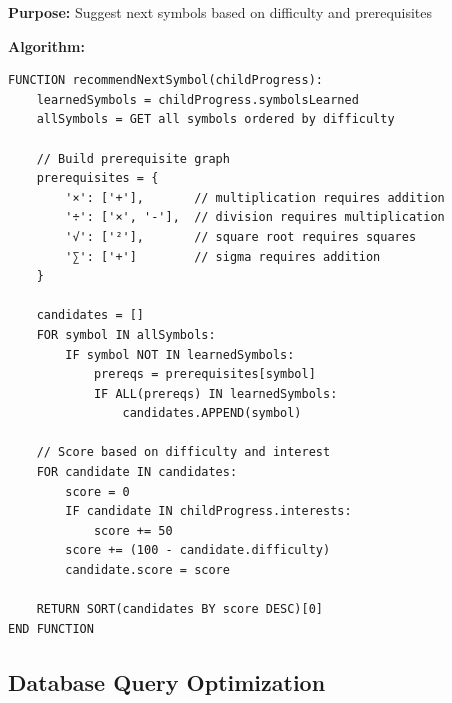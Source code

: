 \documentclass[12pt, a4paper]{article}
\begin{document}
\begin{tcolorbox}[colback=electricblue!5, colframe=electricblue, title=\textbf{Personalized Learning Path}]

\textbf{Purpose:} Suggest next symbols based on difficulty and prerequisites

\textbf{Algorithm:}
\begin{verbatim}
FUNCTION recommendNextSymbol(childProgress):
    learnedSymbols = childProgress.symbolsLearned
    allSymbols = GET all symbols ordered by difficulty
    
    // Build prerequisite graph
    prerequisites = {
        '×': ['+'],       // multiplication requires addition
        '÷': ['×', '-'],  // division requires multiplication
        '√': ['²'],       // square root requires squares
        '∑': ['+']        // sigma requires addition
    }
    
    candidates = []
    FOR symbol IN allSymbols:
        IF symbol NOT IN learnedSymbols:
            prereqs = prerequisites[symbol]
            IF ALL(prereqs) IN learnedSymbols:
                candidates.APPEND(symbol)
    
    // Score based on difficulty and interest
    FOR candidate IN candidates:
        score = 0
        IF candidate IN childProgress.interests:
            score += 50
        score += (100 - candidate.difficulty)
        candidate.score = score
    
    RETURN SORT(candidates BY score DESC)[0]
END FUNCTION
\end{verbatim}

\end{tcolorbox}

\subsection{Database Query Optimization}
\end{document}
